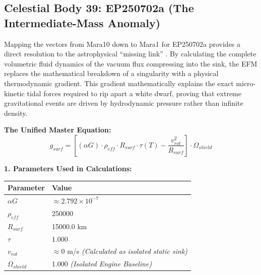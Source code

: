 \documentclass[11pt, a4paper]{article}
\begin{document}
\clearpage
\subsection{Celestial Body 39: EP250702a (The Intermediate-Mass Anomaly)}
  Mapping the vectors from Mara10 down to Mara1 for EP250702a provides a direct resolution to the astrophysical ``missing link'' \cite{ep250702a_2025}. By calculating the complete volumetric fluid dynamics of the vacuum flux compressing into the sink, the EFM replaces the mathematical breakdown of a singularity with a physical thermodynamic gradient. This gradient mathematically explains the exact micro-kinetic tidal forces required to rip apart a white dwarf, proving that extreme gravitational events are driven by hydrodynamic pressure rather than infinite density.

  \vspace{0.5em}
  \noindent \textbf{The Unified Master Equation:}
  $$ g_{surf} = \left[ (\alpha G) \cdot \rho_{eff} \cdot R_{surf} \cdot \tau(T) - \frac{v_{rot}^2}{R_{surf}} \right] \cdot \Omega_{shield} $$

  \vspace{0.5em}
  \noindent \textbf{1. Parameters Used in Calculations:} \\[0.5em]
  \begingroup
  \renewcommand{\arraystretch}{1.3}
  \hspace*{2em}
  \begin{tabular}{|l|l|}
    \hline
    \textbf{Parameter} & \textbf{Value} \\ \hline
    $\alpha G$ & $\approx 2.792 \times 10^{-7}$ \\ \hline
    $\rho_{eff}$ & 250000 \\ \hline
    $R_{surf}$ & 15000.0 km \\ \hline
    $\tau$ & 1.000 \\ \hline
    $v_{rot}$ & $\approx 0$ m/s \textit{(Calculated as isolated static sink)} \\ \hline
    $\Omega_{shield}$ & 1.000 \textit{(Isolated Engine Baseline)} \\ \hline
  \end{tabular}
  \endgroup
\end{document}
